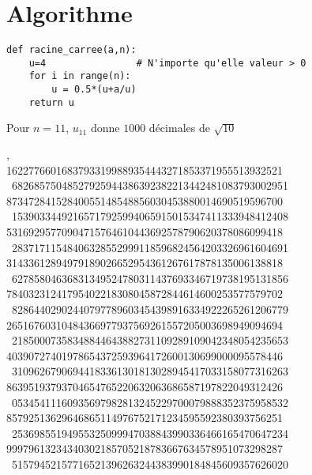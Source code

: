 \section{Algorithme}

\begin{frame}[fragile]
\begin{algo}[secante.py]
\begin{lstlisting}
def racine_carree(a,n):
    u=4                # N'importe qu'elle valeur > 0
    for i in range(n):
        u = 0.5*(u+a/u)
    return u

\end{lstlisting}  
\end{algo} 
\end{frame}


\begin{frame}

\centerline{Pour $n=11$, $u_{11}$ donne $1000$ décimales de $\sqrt{10}$}

\begin{center}
{\scriptsize
\qquad\qquad{}, \hfill\hfill\   \\
16227766016837933199889354443271853371955513932521 \ 68268575048527925944386392382213442481083793002951 \\
87347284152840055148548856030453880014690519596700 \ 15390334492165717925994065915015347411333948412408 \\
53169295770904715764610443692578790620378086099418 \ 28371711548406328552999118596824564203326961604691 \\
31433612894979189026652954361267617878135006138818 \ 62785804636831349524780311437693346719738195131856 \\
78403231241795402218308045872844614600253577579702 \ 82864402902440797789603454398916334922265261206779 \\
26516760310484366977937569261557205003698949094694 \ 21850007358348844643882731109289109042348054235653 \\
40390727401978654372593964172600130699000095578446 \ 31096267906944183361301813028945417033158077316263 \\
86395193793704654765220632063686587197822049312426 \ 05345411160935697982813245229700079888352375958532 \\
85792513629646865114976752171234595592380393756251 \ 25369855194955325099947038843990336466165470647234 \\
99979613234340302185705218783667634578951073298287 \ 51579452157716521396263244383990184845609357626020 \\
  }  
\end{center}


\end{frame}


